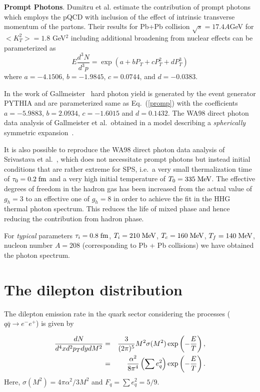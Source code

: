 \documentclass[aps,prc,preprint,superscriptaddress,showpacs,showkeys]{revtex4-1}
\begin{document}
{\bf Prompt Photons}. 
 Dumitru et al. \cite{DUMI} estimate the contribution of prompt photons 
which employs the pQCD with inclusion of the effect of intrinsic 
transverse momentum of the partons. Their results for Pb+Pb collision
$\sqrt{s} = 17.4 A$GeV for $<K_T^2>=1.8$ GeV$^2$ including additional 
broadening from nuclear effects can be parameterized as 
\begin{equation}\label{promp}
 E \frac{d^3 N}{d^3 p} = \exp(a + bP_T + cP_T^2 + dP_T^3)
\end{equation}
where $a=-4.1506$, $b=-1.9845$, $c=0.0744$, and 
$d=-0.0383$.

 In the work of Gallmeister~\cite{GALLMEISTER} hard photon 
 yield is generated by the event generator PYTHIA and are
parameterized same as Eq.~(\ref{promp}) with the coefficients
$a=-5.9883$, $b=2.0934$, $c=-1.6015$ and $d=0.1432$.
 The WA98 direct photon data analysis of Gallmeister et al.\ obtained in 
a model describing a {\em spherically} symmetric 
expansion~\cite{GALLMEISTER}.

 It is also possible to reproduce the WA98 direct photon data analysis of
Srivastava et al.~\cite{SRIVASTAVA}, which does not necessitate prompt
photons but instead initial conditions that are rather extreme for SPS, i.e.\ a
very small thermalization time of $\tau_0 = 0.2\;\mbox{fm}$ and a very high initial
temperature of $T_0 = 335\;\mbox{MeV}$. 
The effective degrees of freedom in the hadron gas has been increased
from the actual value of $g_h = 3$ to an effective one of $g_h =8$ in order 
to achieve the fit in the HHG thermal photon spectrum. This reduces
the life of mixed phase and hence reducing the contribution from 
hadron phase.


For {\em typical} parameters 
%
$\tau_i = 0.8\;\mbox{fm}$, $T_i = 210\;\mbox{MeV}$, $T_c = 160\;\mbox{MeV}$, $T_f = 140\;\mbox{MeV}$, 
%
nucleon number $A=208$ (corresponding to Pb + Pb collisions)
we have obtained the photon spectrum.


\section{The dilepton distribution}

 The dilepton emission rate in the quark sector considering the 
processes ($q \bar q \rightarrow e^- e^+$)
is given \cite{KAJA,VOGT} by 

\begin{eqnarray}\label{}
 {dN \over d^4x d^2p_T dy dM^2}
&=& \frac{3}{(2\pi)^5} M^2 \sigma(M^2)
        \exp\left(-\frac{E}{T}\right), \nonumber \\
&=& \frac{\alpha^2}{8\pi^4} \left(\sum e_q^2\right) 
        \exp\left(-\frac{E}{T}\right).
\end{eqnarray}
Here, $\sigma(M^2)=4\pi\alpha^2/3M^2$ and $F_q = \sum e_q^2 = 5/9$.
\end{document}
